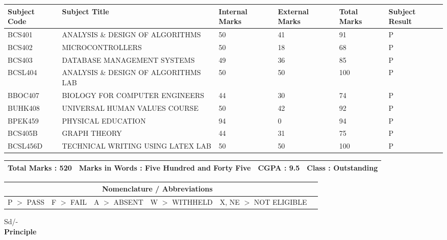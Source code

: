 \documentclass[a4paper,12pt]{article}
\begin{document}
\begin{center} %
\begin{tabular}{|m{2cm}|m{7cm}|m{2cm}|m{2cm}|m{2cm}|m{2cm}|}
    \hline
    \textbf{Subject Code} & \textbf{Subject Title} & \textbf{Internal Marks} & \textbf{External Marks} & \textbf{Total Marks} & \textbf{Subject Result} \\
    \hline
    BCS401 & ANALYSIS \& DESIGN OF ALGORITHMS  & 50 & 41 & 91 & P \\
    \hline
    BCS402 & MICROCONTROLLERS  & 50 & 18 & 68 & P \\
    \hline
    BCS403 & DATABASE MANAGEMENT SYSTEMS & 49 & 36 & 85 & P \\
    \hline
    BCSL404 & ANALYSIS \& DESIGN OF ALGORITHMS LAB  & 50 & 50 & 100 & P \\
    \hline
    BBOC407 & BIOLOGY FOR COMPUTER ENGINEERS & 44 & 30 & 74 & P \\
    \hline
    BUHK408 & UNIVERSAL HUMAN VALUES COURSE & 50 & 42 & 92 & P \\
    \hline
    BPEK459 & PHYSICAL EDUCATION &  94 & 0 & 94 & P \\
    \hline
    BCS405B & GRAPH THEORY &  44 & 31 & 75 & P \\
    \hline
    BCSL456D & TECHNICAL WRITING USING LATEX LAB & 50 & 50 & 100 & P \\
    \hline
\end{tabular}
\end{center}
\begin{center}
\begin{tabular}{|m{3cm}|m{6cm}|m{3cm}|m{2cm}|m{4cm}|}
\hline
    \textbf{Total Marks} : 520 & \multicolumn{2}{|c|}{\textbf{Marks in Words} : Five Hundred and Forty Five} & \textbf{CGPA }: 9.5 & \textbf{Class} :  Outstanding \\
    \hline
\end{tabular}
\end{center} 

\begin{center}
\begin{tabular}{|m{3cm}|m{3cm}|m{3cm}|m{3cm}|m{4cm}|m{7cm}|}
\hline
\multicolumn{5}{|c|}{\textbf{Nomenclature / Abbreviations}} \\
\hline
P $>$ PASS & F $>$ FAIL & A $>$ ABSENT & W $>$ WITHHELD & X, NE $>$ NOT ELIGIBLE \\
\hline
\end{tabular}
\end{center}

\vspace{3cm}

\begin{flushright}
    Sd/- \\
    \textbf{Principle}
\end{flushright}

\vspace{0.5cm}

\noindent
\vfill
\end{document}

